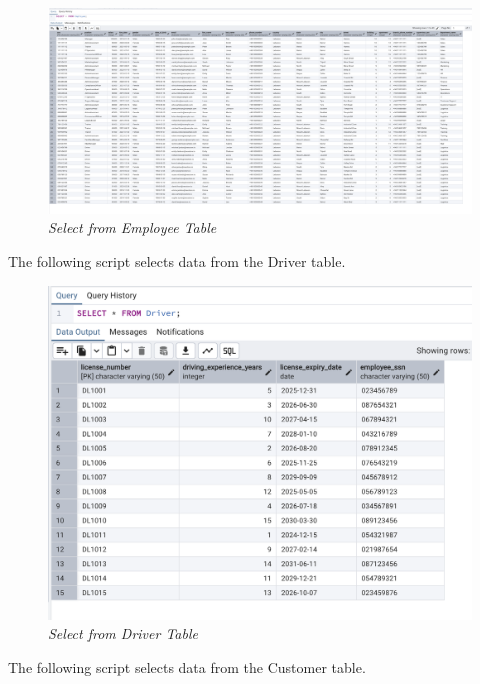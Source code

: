 \begin{figure}[H]
  \centering
  \includegraphics[width=1\textwidth]{images/sql/select/employee.png}
  \caption{\textit{Select from Employee Table}}
\end{figure}

The following script selects data from the Driver table.


\begin{figure}[H]
  \centering
  \includegraphics[width=1\textwidth]{images/sql/select/driver.png}
  \caption{\textit{Select from Driver Table}}
\end{figure}

The following script selects data from the Customer table.


